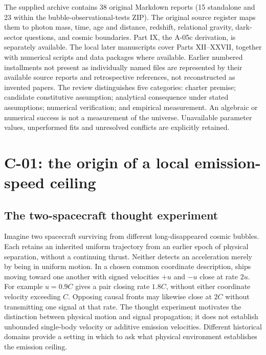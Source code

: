 \documentclass[
  11pt,
  twoside]{article}
\begin{document}
The supplied archive contains 38 original Markdown reports (15
standalone and 23 within the bubble-observational-tests ZIP). The
original source register maps them to photon mass, time, age and
distance, redshift, relational gravity, dark-sector questions, and
cosmic boundaries. Part IX, the A-05c derivation, is separately
available. The local later manuscripts cover Parts XII--XXVII, together
with numerical scripts and data packages where available. Earlier
numbered installments not present as individually named files are
represented by their available source reports and retrospective
references, not reconstructed as invented papers. The review
distinguishes five categories: charter premise; candidate constitutive
assumption; analytical consequence under stated assumptions; numerical
verification; and empirical measurement. An algebraic or numerical
success is not a measurement of the universe. Unavailable parameter
values, unperformed fits and unresolved conflicts are explicitly
retained.

\section{C-01: the origin of a local emission-speed
ceiling}\label{c-01-the-origin-of-a-local-emission-speed-ceiling}

\subsection{The two-spacecraft thought
experiment}\label{the-two-spacecraft-thought-experiment}

Imagine two spacecraft surviving from different long-disappeared cosmic
bubbles. Each retains an inherited uniform trajectory from an earlier
epoch of physical separation, without a continuing thrust. Neither
detects an acceleration merely by being in uniform motion. In a chosen
common coordinate description, ships moving toward one another with
signed velocities \(+u\) and \(-u\) close at rate \(2u\). For example
\(u=0.9C\) gives a pair closing rate \(1.8C\), without either coordinate
velocity exceeding \(C\). Opposing causal fronts may likewise close at
\(2C\) without transmitting one signal at that rate. The thought
experiment motivates the distinction between physical motion and signal
propagation; it does not establish unbounded single-body velocity or
additive emission velocities. Different historical domains provide a
setting in which to ask what physical environment establishes the
emission ceiling.
\end{document}
